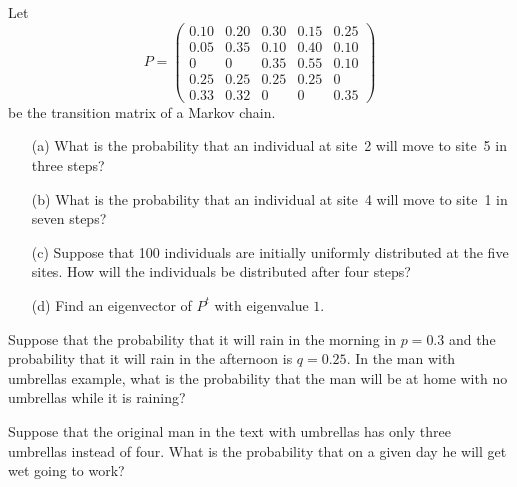 \documentclass{ximera}
\begin{document}
\begin{exercise} \label{c4.10.7}
Let
\begin{equation*}
P = \left(\begin{array}{ccccc}
 0.10 & 0.20 & 0.30 & 0.15 & 0.25\\
 0.05 & 0.35 & 0.10 & 0.40 & 0.10\\
   0  &   0  & 0.35 & 0.55 & 0.10\\
 0.25 & 0.25 & 0.25 & 0.25 &   0\\
 0.33 & 0.32 &   0  &   0  & 0.35
\end{array}\right)
\end{equation*}
be the transition matrix of a Markov chain.
\begin{itemize}
\item[(a)]  What is the probability that an individual at site~2 will move to
site~5 in three steps?
\item[(b)]  What is the probability that an individual at site~4 will move to
site~1 in seven steps?
\item[(c)]  Suppose that 100 individuals are initially uniformly distributed
at the five sites.  How will the individuals be distributed after four steps?
\item[(d)]  Find an eigenvector of $P^t$ with eigenvalue $1$.
\end{itemize}
\end{exercise}

\begin{exercise} \label{c4.10.8}
Suppose that the probability that it will rain in the morning in $p=0.3$ and
the probability that it will rain in the afternoon is $q=0.25$.  In the man
with umbrellas example, what is the probability that the man will be at home
with no umbrellas while it is raining?
\end{exercise}

\begin{exercise} \label{c4.10.9}
Suppose that the original man in the text with umbrellas has only three
umbrellas instead of four.  What is the probability that on a given day he
will get wet going to work?
\end{exercise}
\end{document}

